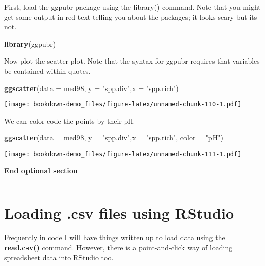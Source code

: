 \documentclass[]{book}
\newenvironment{Shaded}{\begin{snugshade}}{\end{snugshade}}
\newcommand{\KeywordTok}[1]{\textcolor[rgb]{0.13,0.29,0.53}{\textbf{#1}}}
\newcommand{\DataTypeTok}[1]{\textcolor[rgb]{0.13,0.29,0.53}{#1}}
\newcommand{\StringTok}[1]{\textcolor[rgb]{0.31,0.60,0.02}{#1}}
\newcommand{\NormalTok}[1]{#1}
\theoremstyle{definition}
\theoremstyle{definition}
\theoremstyle{definition}
\theoremstyle{remark}
\begin{document}
First, load the ggpubr package using the library() command. Note that
you might get some output in red text telling you about the packages; it
looks scary but its not.

\begin{Shaded}
\begin{Highlighting}[]
\KeywordTok{library}\NormalTok{(ggpubr)}
\end{Highlighting}
\end{Shaded}

Now plot the scatter plot. Note that the syntax for ggpubr requires that
variables be contained within quotes.

\begin{Shaded}
\begin{Highlighting}[]
\KeywordTok{ggscatter}\NormalTok{(}\DataTypeTok{data =}\NormalTok{ med98, }\DataTypeTok{y =} \StringTok{"spp.div"}\NormalTok{,}\DataTypeTok{x =} \StringTok{"spp.rich"}\NormalTok{)}
\end{Highlighting}
\end{Shaded}

\texttt{[image: bookdown-demo\_files/figure-latex/unnamed-chunk-110-1.pdf]}

We can color-code the points by their pH

\begin{Shaded}
\begin{Highlighting}[]
\KeywordTok{ggscatter}\NormalTok{(}\DataTypeTok{data =}\NormalTok{ med98, }\DataTypeTok{y =} \StringTok{"spp.div"}\NormalTok{,}\DataTypeTok{x =} \StringTok{"spp.rich"}\NormalTok{, }\DataTypeTok{color =} \StringTok{"pH"}\NormalTok{)}
\end{Highlighting}
\end{Shaded}

\texttt{[image: bookdown-demo\_files/figure-latex/unnamed-chunk-111-1.pdf]}

\textbf{End optional section}

\begin{center}\rule{0.5\linewidth}{\linethickness}\end{center}

\section{\texorpdfstring{Loading .csv files using RStudio
\protect\hyperlink{section-3}{}}{Loading .csv files using RStudio }}\label{loading-.csv-files-using-rstudio}

Frequently in code I will have things written up to load data using the
\textbf{read.csv()} command. However, there is a point-and-click way of
loading spreadsheet data into RStudio too.
\end{document}
